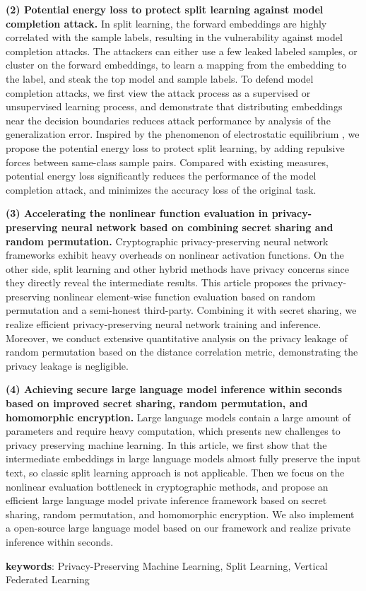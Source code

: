 \textbf{(2) Potential energy loss to protect split learning against model completion attack.}
In split learning, the forward embeddings are highly correlated with the sample labels, resulting in the vulnerability against model completion attacks.
%
The attackers can either use a few leaked labeled samples, or cluster on the forward embeddings, to learn a mapping from the embedding to the label, and steak the top model and sample labels.
%
To defend model completion attacks, we first view the attack process as a supervised or unsupervised learning process, and demonstrate that distributing embeddings near the decision boundaries reduces attack performance by analysis of the generalization error.
%
Inspired by the phenomenon of electrostatic equilibrium , we propose the potential energy loss to protect split learning, by adding repulsive forces between same-class sample pairs.
%
Compared with existing measures, potential energy loss significantly reduces the performance of the model completion attack, and minimizes the accuracy loss of the original task.


\textbf{(3) Accelerating the nonlinear function evaluation in privacy-preserving neural network based on combining secret sharing and random permutation.}
Cryptographic privacy-preserving neural network frameworks exhibit heavy overheads on nonlinear activation functions.
On the other side, split learning and other hybrid methods have privacy concerns since they directly reveal the intermediate results.
%
This article proposes the privacy-preserving nonlinear element-wise function evaluation based on random permutation and a semi-honest third-party.
%
Combining it with secret sharing, we realize efficient privacy-preserving neural network training and inference.
%
Moreover, we conduct extensive quantitative analysis on the privacy leakage of random permutation based on the distance correlation metric, demonstrating the privacy leakage is negligible.

\textbf{(4) Achieving secure large language model inference within seconds based on improved secret sharing, random permutation, and homomorphic encryption.}
Large language models contain a large amount of parameters and require heavy computation, which presents new challenges to privacy preserving machine learning.
%
In this article, we first show that the intermediate embeddings in large language models almost fully preserve the input text, so classic split learning approach is not applicable.
%
Then we focus on the nonlinear evaluation bottleneck in cryptographic methods, and propose an efficient large language model private inference framework based on secret sharing, random permutation, and homomorphic encryption.
%
We also implement a open-source large language model based on our framework and realize private inference within seconds.
%

\noindent \textbf{keywords}: Privacy-Preserving Machine Learning, Split Learning, Vertical Federated Learning